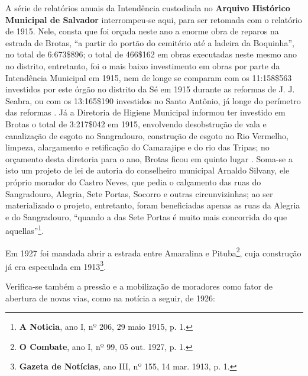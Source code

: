 A série de relatórios anuais da Intendência custodiada no \textbf{Arquivo Histórico Municipal de Salvador} interrompeu-se aqui, para ser retomada com o relatório de 1915. Nele, consta que foi orçada neste ano a enorme obra de reparos na estrada de Brotas, ``a partir do portão do cemitério até a ladeira da Boquinha'', no total de 6:673\$896; o total de 466\$162 em obras executadas neste mesmo ano no distrito, entretanto, foi o mais baixo investimento em obras por parte da Intendência Municipal em 1915, nem de longe se comparam com os 11:158\$563 investidos por este órgão no distrito da Sé em 1915 durante as reformas de J. J. Seabra, ou com os 13:165\$190 investidos no Santo Antônio, já longe do perímetro das reformas \cite[pp.~127-128]{salvador_relatorio_1916}. Já a Diretoria de Higiene Municipal informou ter investido em Brotas o total de 3:217\$042 em 1915, envolvendo desobstrução de vala e canalização de esgoto no Sangradouro, construção de esgoto no Rio Vermelho, limpeza, alargamento e retificação do Camarajipe e do rio das Tripas; no orçamento desta diretoria para o ano, Brotas ficou em quinto lugar \cite[pp.~195-196]{salvador_relatorio_1916}. Soma-se a isto um projeto de lei de autoria do conselheiro municipal Arnaldo Silvany, ele próprio morador do Castro Neves, que pedia o calçamento das ruas do Sangradouro, Alegria, Sete Portas, Socorro e outras circunvizinhas; ao ser materializado o projeto, entretanto, foram beneficiadas apenas as ruas da Alegria e do Sangradouro, ``quando a das Sete Portas é muito mais concorrida do que aquellas''\footnote{\textbf{A Noticia}, ano I, nº 206, 29 maio 1915, p. 1.}.

Em 1927 foi mandada abrir a estrada entre Amaralina e Pituba\footnote{\textbf{O Combate}, ano I, nº 99, 05 out. 1927, p. 1.}, cuja construção já era especulada em 1913\footnote{\textbf{Gazeta de Notícias}, ano III, nº 155, 14 mar. 1913, p. 1.}.

Verifica-se também a pressão e a mobilização de moradores como fator de abertura de novas vias, como na notícia a seguir, de 1926:

